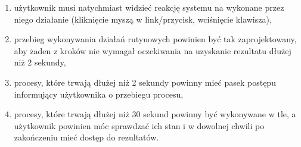 \documentclass[a4paper]{report}
\begin{document}
\begin{enumerate}
\begin{enumerate}
            \begin{enumerate}
              \item użytkownik musi natychmiast widzieć reakcję systemu na wykonane przez niego działanie (kliknięcie myszą w link/przycisk, wciśnięcie klawisza),
              \item przebieg wykonywania działań rutynowych powinien być tak zaprojektowany, aby żaden z kroków nie wymagał oczekiwania na uzyskanie rezultatu dłużej niż 2 sekundy,
              \item procesy, które trwają dłużej niż 2 sekundy powinny mieć pasek postępu informujący użytkownika o przebiegu procesu,
              \item procesy, które trwają dłużej niż 30 sekund powinny być wykonywane w tle, a użytkownik powinien móc sprawdzać ich stan i w dowolnej chwili po zakończeniu mieć dostęp do rezultatów.
            \end{enumerate}
	  \end{enumerate}
\end{enumerate}
\end{document}
